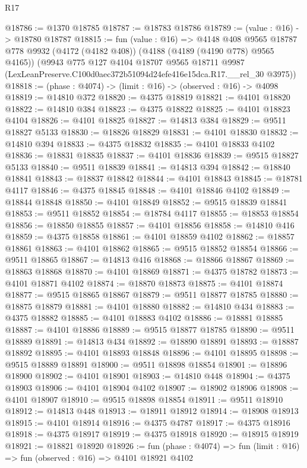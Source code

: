 \begin{lexlean}{R17}
\begin{coremodule}
@18786 := @1370 @18785
@18787 := @18783 @18786
@18789 := (value : @16) -> @18780 @18787
@18815 := fun (value : @16) =>
  @4148
    @408
    @9565
    @18787
    @778
    @9932
    (@4172 (@4182 @408))
    (@4188 (@4189 (@4190 @778) @9565 @4165))
    (@9943
      @775
      @127
      @4104
      @18707
      @9565
      @18711
      @9987
      (LexLeanPreserve.C100d0aec372b51094d24efe416e15dca.R17.__rel_30 @3975))
@18818 := (phase : @4074) -> (limit : @16) -> (observed : @16) -> @4098
@18819 := @14810 @372
@18820 := @4375 @18819
@18821 := @4101 @18820
@18822 := @14810 @384
@18823 := @4375 @18822
@18825 := @4101 @18823 @4104
@18826 := @4101 @18825
@18827 := @14813 @384
@18829 := @9511 @18827 @5133
@18830 := @18826 @18829
@18831 := @4101 @18830
@18832 := @14810 @394
@18833 := @4375 @18832
@18835 := @4101 @18833 @4102
@18836 := @18831 @18835
@18837 := @4101 @18836
@18839 := @9515 @18827 @5133
@18840 := @9511 @18839
@18841 := @14813 @394
@18842 := @18840 @18841
@18843 := @18837 @18842
@18844 := @4101 @18843
@18845 := @18781 @4117
@18846 := @4375 @18845
@18848 := @4101 @18846 @4102
@18849 := @18844 @18848
@18850 := @4101 @18849
@18852 := @9515 @18839 @18841
@18853 := @9511 @18852
@18854 := @18784 @4117
@18855 := @18853 @18854
@18856 := @18850 @18855
@18857 := @4101 @18856
@18858 := @14810 @416
@18859 := @4375 @18858
@18861 := @4101 @18859 @4102
@18862 := @18857 @18861
@18863 := @4101 @18862
@18865 := @9515 @18852 @18854
@18866 := @9511 @18865
@18867 := @14813 @416
@18868 := @18866 @18867
@18869 := @18863 @18868
@18870 := @4101 @18869
@18871 := @4375 @18782
@18873 := @4101 @18871 @4102
@18874 := @18870 @18873
@18875 := @4101 @18874
@18877 := @9515 @18865 @18867
@18879 := @9511 @18877 @18785
@18880 := @18875 @18879
@18881 := @4101 @18880
@18882 := @14810 @434
@18883 := @4375 @18882
@18885 := @4101 @18883 @4102
@18886 := @18881 @18885
@18887 := @4101 @18886
@18889 := @9515 @18877 @18785
@18890 := @9511 @18889
@18891 := @14813 @434
@18892 := @18890 @18891
@18893 := @18887 @18892
@18895 := @4101 @18893 @18848
@18896 := @4101 @18895
@18898 := @9515 @18889 @18891
@18900 := @9511 @18898 @18854
@18901 := @18896 @18900
@18902 := @4101 @18901
@18903 := @14810 @448
@18904 := @4375 @18903
@18906 := @4101 @18904 @4102
@18907 := @18902 @18906
@18908 := @4101 @18907
@18910 := @9515 @18898 @18854
@18911 := @9511 @18910
@18912 := @14813 @448
@18913 := @18911 @18912
@18914 := @18908 @18913
@18915 := @4101 @18914
@18916 := @4375 @4787
@18917 := @4375 @18916
@18918 := @4375 @18917
@18919 := @4375 @18918
@18920 := @18915 @18919
@18921 := @18821 @18920
@18926 := fun (phase : @4074) => fun (limit : @16) => fun (observed : @16) => @4101 @18921 @4102

\end{coremodule}
\end{lexlean}
